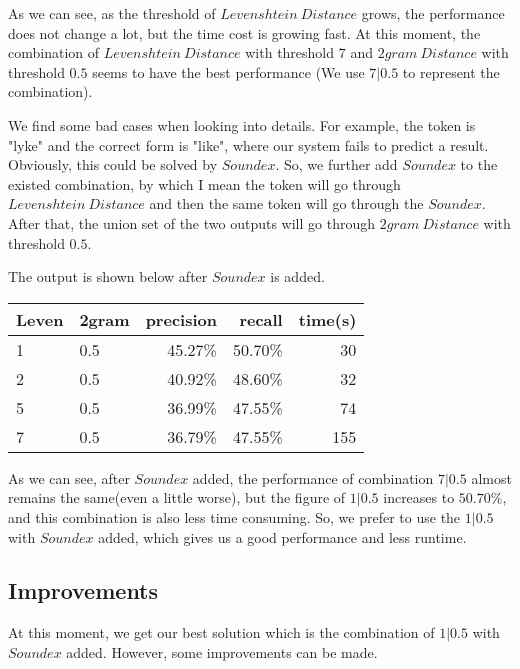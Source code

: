 \documentclass[11pt]{article}
\begin{document}
As we can see, as the threshold of $Levenshtein \ Distance$ grows,
the performance does not change a lot,
but the time cost is growing fast.
At this moment, the combination of $Levenshtein \ Distance$ with threshold $7$
and $2gram \ Distance$ with threshold $0.5$ seems to have the best performance
(We use $7|0.5$ to represent the combination).

We find some bad cases when looking into details.
For example, the token is "lyke" and the correct form is "like",
where our system fails to predict a result.
Obviously, this could be solved by $Soundex$\cite{soundex}.
So, we further add $Soundex$ to the existed combination,
by which I mean the token will go through $Levenshtein \ Distance$
and then the same token will go through the $Soundex$.
After that, the union set of the two outputs will go through
$2gram \ Distance$ with threshold $0.5$.

The output is shown below after $Soundex$ is added.
\begin{center}
    \begin{tabular}{|l|l|r|r|r|}
      \hline
      Leven & 2gram & precision & recall & time(s)\\
      \hline
      1 & 0.5 & 45.27\% & 50.70\% & 30\\
      \hline
      2 & 0.5 & 40.92\% & 48.60\% & 32\\
      \hline
      5 & 0.5 & 36.99\% & 47.55\% & 74\\
      \hline
      7 & 0.5 & 36.79\% & 47.55\% & 155\\
      \hline
    \end{tabular}
\end{center}

As we can see, after $Soundex$ added,
the performance of combination $7|0.5$ almost remains the same(even a little worse),
but the figure of $1|0.5$ increases to $50.70\%$,
and this combination is also less time consuming.
So, we prefer to use the $1|0.5$ with $Soundex$ added,
which gives us a good performance and less runtime.

\subsection{Improvements}
At this moment, we get our best solution
which is the combination of $1|0.5$ with $Soundex$ added.
However, some improvements can be made.
\end{document}

